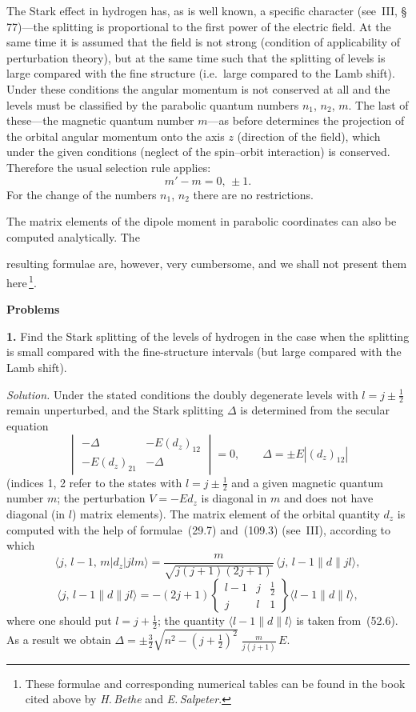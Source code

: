 The Stark effect in hydrogen has, as is well known, a specific character (see~III, \S\,77)---the splitting is proportional to the first power of the electric field. At the same time it is assumed that the field is not strong (condition of applicability of perturbation theory), but at the same time such that the splitting of levels is large compared with the fine structure (i.e.\ large compared to the Lamb shift). Under these conditions the angular momentum is not conserved at all and the levels must be classified by the parabolic quantum numbers $n_1$, $n_2$, $m$. The last of these---the magnetic quantum number $m$---as before determines the projection of the orbital angular momentum onto the axis $z$ (direction of the field), which under the given conditions (neglect of the spin--orbit interaction) is conserved. Therefore the usual selection rule applies:
\begin{equation}
m' - m = 0,\,\pm 1.
\tag{52.10}
\end{equation}
For the change of the numbers $n_1$, $n_2$ there are no restrictions.

The matrix elements of the dipole moment in parabolic coordinates can also be computed analytically. The

resulting formulae are, however, very cumbersome, and we shall not present them here\,\footnote{These formulae and corresponding numerical tables can be found in the book cited above by \textit{H.\,Bethe} and \textit{E.\,Salpeter}.}.

\bigskip
\begin{center}\textbf{Problems}\end{center}
\smallskip
\textbf{1.} Find the Stark splitting of the levels of hydrogen in the case when the splitting is small compared with the fine-structure intervals (but large compared with the Lamb shift).

\textit{Solution.} Under the stated conditions the doubly degenerate levels with $l = j \pm \tfrac{1}{2}$ remain unperturbed, and the Stark splitting $\Delta$ is determined from the secular equation
\[
\begin{vmatrix} -\Delta & -E(d_z)_{12} \\ -E(d_z)_{21} & -\Delta\end{vmatrix} = 0,\qquad \Delta = \pm E|(d_z)_{12}|
\]
(indices 1, 2 refer to the states with $l = j \pm \tfrac{1}{2}$ and a given magnetic quantum number $m$; the perturbation $V = -Ed_z$ is diagonal in $m$ and does not have diagonal (in $l$) matrix elements). The matrix element of the orbital quantity $d_z$ is computed with the help of formulae~(29.7) and~(109.3) (see~III), according to which
\[
\langle j,\,l-1,\,m|d_z|jlm\rangle = \frac{m}{\sqrt{j(j+1)(2j+1)}}\,\langle j,\,l-1\|d\|jl\rangle,
\]
\[
\langle j,\,l-1\|d\|jl\rangle = -(2j+1)\begin{Bmatrix} l-1 & j & \tfrac{1}{2} \\ j & l & 1\end{Bmatrix}\langle l-1\|d\|l\rangle,
\]
where one should put $l = j + \tfrac{1}{2}$; the quantity $\langle l-1\|d\|l\rangle$ is taken from~(52.6). As a result we obtain $\Delta = \pm\tfrac{3}{2}\sqrt{n^2 - (j+\tfrac{1}{2})^2}\;\frac{m}{j(j+1)}\,E$.

